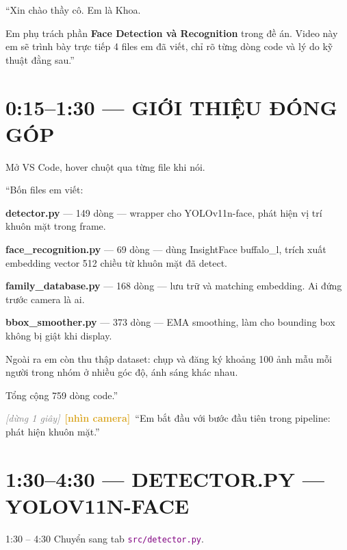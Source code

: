 \documentclass[12pt, a4paper]{article}
\newcommand{\fpath}[1]{\texttt{\textcolor{purple}{#1}}}
\newcommand{\pause}{\textcolor{gray}{\textit{[dừng 1 giây]}}}
\newcommand{\camlook}{\textcolor{Goldenrod}{\textbf{[nhìn camera]}}}
\begin{document}
\begin{say}
``Xin chào thầy cô. Em là Khoa.

Em phụ trách phần \textbf{Face Detection và Recognition} trong đề án.
Video này em sẽ trình bày trực tiếp 4 files em đã viết,
chỉ rõ từng dòng code và lý do kỹ thuật đằng sau.''
\end{say}

\section{0:15--1:30 --- GIỚI THIỆU ĐÓNG GÓP}

\begin{doact}
Mở VS Code, hover chuột qua từng file khi nói.
\end{doact}

\begin{say}
``Bốn files em viết:

\textbf{detector.py} --- 149 dòng --- wrapper cho YOLOv11n-face, phát hiện vị trí khuôn mặt trong frame.

\textbf{face\_recognition.py} --- 69 dòng --- dùng InsightFace buffalo\_l, trích xuất embedding vector 512 chiều từ khuôn mặt đã detect.

\textbf{family\_database.py} --- 168 dòng --- lưu trữ và matching embedding. Ai đứng trước camera là ai.

\textbf{bbox\_smoother.py} --- 373 dòng --- EMA smoothing, làm cho bounding box không bị giật khi display.

Ngoài ra em còn thu thập dataset: chụp và đăng ký khoảng 100 ảnh mẫu mỗi người trong nhóm ở nhiều góc độ, ánh sáng khác nhau.

Tổng cộng 759 dòng code.''

\pause\ \camlook\ ``Em bắt đầu với bước đầu tiên trong pipeline: phát hiện khuôn mặt.''
\end{say}

\section{1:30--4:30 --- DETECTOR.PY --- YOLOV11N-FACE}

\begin{timing}{1:30 -- 4:30}
Chuyển sang tab \fpath{src/detector.py}.
\end{timing}
\end{document}
